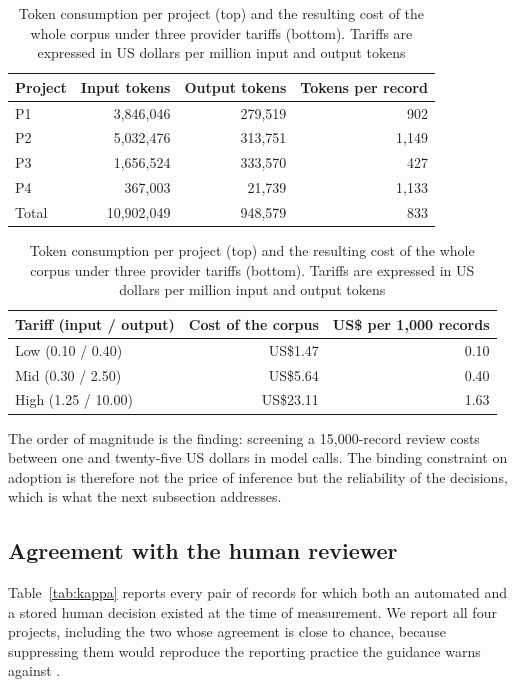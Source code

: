\begin{table}[htbp]
\centering
\caption{Token consumption per project (top) and the resulting cost of the
whole corpus under three provider tariffs (bottom). Tariffs are expressed in US
dollars per million input and output tokens}
\label{tab:cost}
\small
\begin{tabular}{@{}lrrr@{}}
\toprule
Project & Input tokens & Output tokens & Tokens per record \\
\midrule
P1 & 3{,}846{,}046 & 279{,}519 & 902 \\
P2 & 5{,}032{,}476 & 313{,}751 & 1{,}149 \\
P3 & 1{,}656{,}524 & 333{,}570 & 427 \\
P4 & 367{,}003 & 21{,}739 & 1{,}133 \\
\midrule
Total & 10{,}902{,}049 & 948{,}579 & 833 \\
\bottomrule
\end{tabular}

\vspace{2mm}
\begin{tabular}{@{}lrr@{}}
\toprule
Tariff (input / output) & Cost of the corpus & US\$ per 1{,}000 records \\
\midrule
Low (0.10 / 0.40) & US\$1.47 & 0.10 \\
Mid (0.30 / 2.50) & US\$5.64 & 0.40 \\
High (1.25 / 10.00) & US\$23.11 & 1.63 \\
\bottomrule
\end{tabular}
\end{table}

The order of magnitude is the finding: screening a 15{,}000-record review costs
between one and twenty-five US dollars in model calls. The binding constraint
on adoption is therefore not the price of inference but the reliability of the
decisions, which is what the next subsection addresses.

\subsection{Agreement with the human reviewer}

Table~\ref{tab:kappa} reports every pair of records for which both an
automated and a stored human decision existed at the time of measurement. We
report all four projects, including the two whose agreement is close to
chance, because suppressing them would reproduce the reporting practice the
guidance warns against \autocite{Farotimi_2025}.

